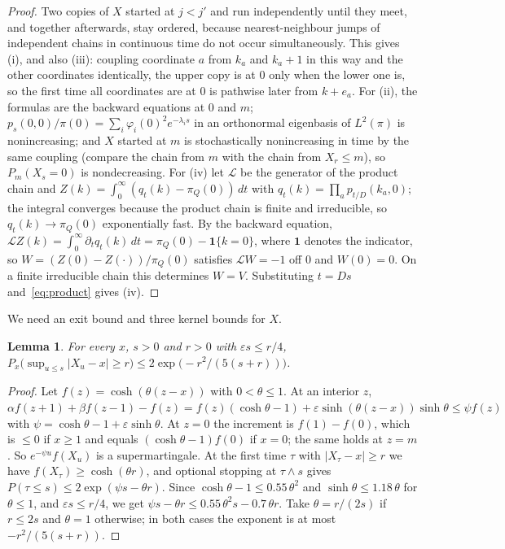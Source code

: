 \documentclass[11pt]{amsart}
\newtheorem{lemma}[theorem]{Lemma}
\theoremstyle{remark}
\newcommand{\eps}{\varepsilon}
\begin{document}
\begin{proof}
Two copies of $X$ started at $j<j'$ and run independently until they meet, and together afterwards, stay ordered,
because nearest-neighbour jumps of independent chains in continuous time do not occur simultaneously. This gives (i),
and also (iii): coupling coordinate $a$ from $k_a$ and $k_a+1$ in this way and the other coordinates identically, the
upper copy is at $0$ only when the lower one is, so the first time all coordinates are at $0$ is pathwise later from
$k+e_a$. For (ii), the formulas are the backward equations at $0$ and $m$; $p_s(0,0)/\pi(0)=\sum_i\varphi_i(0)^2e^{-\lambda_is}$
in an orthonormal eigenbasis of $L^2(\pi)$ is nonincreasing; and $X$ started at $m$ is stochastically nonincreasing in
time by the same coupling (compare the chain from $m$ with the chain from $X_r\le m$), so $P_m(X_s=0)$ is
nondecreasing. For (iv) let $\mathcal L$ be the generator of the product chain and
$Z(k)=\int_0^\infty(q_t(k)-\pi_Q(0))\,dt$ with $q_t(k)=\prod_ap_{t/D}(k_a,0)$; the integral converges because the product chain is finite and
irreducible, so $q_t(k)\to\pi_Q(0)$ exponentially fast. By the backward equation, $\mathcal LZ(k)=\int_0^\infty\partial_tq_t(k)\,dt=\pi_Q(0)-\mathbf
1\{k=0\}$, where $\mathbf 1$ denotes the indicator, so $W=(Z(0)-Z(\cdot))/\pi_Q(0)$ satisfies $\mathcal LW=-1$ off $0$ and $W(0)=0$. On a finite irreducible
chain this determines $W=V$. Substituting $t=Ds$ and~\eqref{eq:product} gives (iv).
\end{proof}

We need an exit bound and three kernel bounds for $X$.

\begin{lemma}\label{lem:exit}
For every $x$, $s>0$ and $r>0$ with $\eps s\le r/4$, $P_x\bigl(\sup_{u\le s}|X_u-x|\ge r\bigr)\le2\exp\bigl(-r^2/(5(s+r))\bigr)$.
\end{lemma}

\begin{proof}
Let $f(z)=\cosh(\theta(z-x))$ with $0<\theta\le1$. At an interior $z$,
$\alpha f(z+1)+\beta f(z-1)-f(z)=f(z)(\cosh\theta-1)+\eps\sinh(\theta(z-x))\sinh\theta\le\psi f(z)$ with
$\psi=\cosh\theta-1+\eps\sinh\theta$. At $z=0$ the increment is $f(1)-f(0)$, which is $\le0$ if $x\ge1$ and equals
$(\cosh\theta-1)f(0)$ if $x=0$; the same holds at $z=m$. So $e^{-\psi u}f(X_u)$ is a supermartingale. At the first time
$\tau$ with $|X_\tau-x|\ge r$ we have $f(X_\tau)\ge\cosh(\theta r)$, and optional stopping at $\tau\wedge s$ gives
$P(\tau\le s)\le2\exp(\psi s-\theta r)$. Since $\cosh\theta-1\le0.55\,\theta^2$ and $\sinh\theta\le1.18\,\theta$ for
$\theta\le1$, and $\eps s\le r/4$, we get $\psi s-\theta r\le0.55\,\theta^2s-0.7\,\theta r$. Take $\theta=r/(2s)$ if
$r\le2s$ and $\theta=1$ otherwise; in both cases the exponent is at most $-r^2/(5(s+r))$.
\end{proof}
\end{document}
